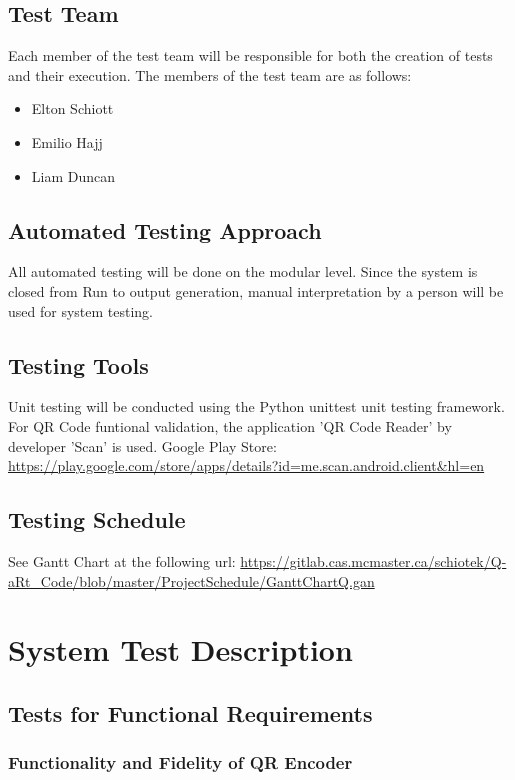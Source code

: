 \documentclass[12pt, titlepage]{article}
\begin{document}
\subsection{Test Team}
	Each member of the test team will be responsible for both the creation of 
	tests and their execution. The members of the test team are as follows:
	\begin{itemize}
		\item Elton Schiott
		\item Emilio Hajj
		\item Liam Duncan
	\end{itemize}
\subsection{Automated Testing Approach}
	All automated testing will be done on the modular level. 
    Since the system is closed from Run to output generation, manual interpretation by a person will be used for system testing.

\subsection{Testing Tools}
	Unit testing will be conducted using the Python unittest unit testing framework.
	For QR Code funtional validation, the application 'QR Code Reader' by developer 'Scan' is used.
	Google Play Store: \url{https://play.google.com/store/apps/details?id=me.scan.android.client&hl=en}
\subsection{Testing Schedule}
		
See Gantt Chart at the following url:
\url{https://gitlab.cas.mcmaster.ca/schiotek/Q-aRt_Code/blob/master/ProjectSchedule/GanttChartQ.gan}

\section{System Test Description}
	
\subsection{Tests for Functional Requirements}

\subsubsection{Functionality and Fidelity of QR Encoder}
		
\end{document}
